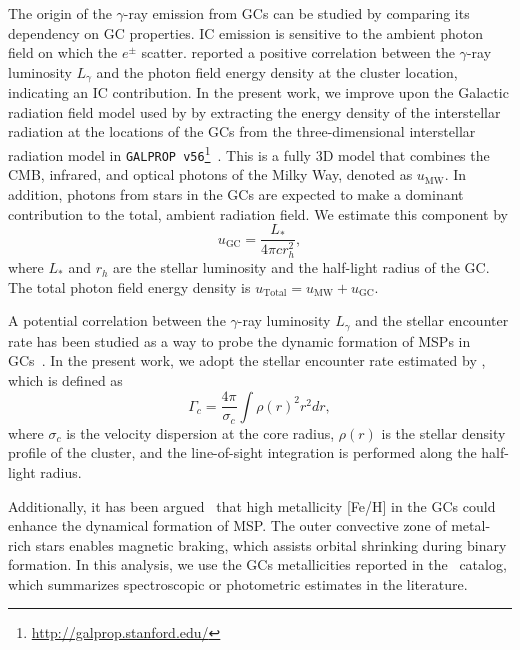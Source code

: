 \documentclass[doublespace,draft,nopageskip]{VTthesis} %
\begin{document}
The origin of the $\gamma$-ray emission from GCs can be studied by comparing its dependency on GC properties. IC emission is sensitive to the ambient photon field on which the $e^\pm$ scatter. \citet{2011ApJ...726..100H} reported a positive correlation between the $\gamma$-ray luminosity $L_\gamma$ and the photon field energy density at the cluster location, indicating an IC contribution. In the present work, we improve upon the Galactic radiation field model used by \citet{2011ApJ...726..100H} by extracting the energy density of the interstellar radiation at the locations of the GCs from the three-dimensional interstellar radiation model in \texttt{GALPROP v56}\footnote{\url{http://galprop.stanford.edu/}}~\citep{2017ApJ...846...67P,2018ApJ...856...45J}. This is a fully 3D model that combines the CMB, infrared, and optical photons of the Milky Way, denoted as $u_\text{MW}$. In addition, photons from stars in the GCs are expected to make a dominant contribution to the total, ambient radiation field. We estimate this component by
\begin{equation}
    u_{\text{GC}} = \dfrac{L_*}{4\pi c r_h^2},
    \label{eq:GCRF}
\end{equation}
where $L_*$ and $r_h$ are the stellar luminosity and the half-light radius of the GC. The total photon field energy density is $u_\text{Total} = u_\text{MW} + u_\text{GC}$.

A potential correlation between the $\gamma$-ray luminosity $L_\gamma$ and the stellar encounter rate has been studied as a way to probe the dynamic formation of MSPs in GCs~\citep{2010A&A...524A..75A,2011ApJ...726..100H,2019MNRAS.486..851D}. In the present work, we adopt the stellar encounter rate estimated by \citet{2013ApJ...766..136B}, which is defined as
\begin{equation}
    \Gamma_c = \frac{4\pi}{\sigma_c}\int\rho(r)^2 r^2dr,
	\label{eq:encounter}
\end{equation}
where $\sigma_c$ is the velocity dispersion at the core radius, $\rho(r)$ is the stellar density profile of the cluster, and the line-of-sight integration is performed along the half-light radius. 

Additionally, it has been argued~\citep{2011ApJ...726..100H,2019MNRAS.486..851D} that high metallicity [Fe/H] in the GCs could enhance the dynamical formation of MSP. The outer convective zone of metal-rich stars enables magnetic braking, which assists orbital shrinking during binary formation. In this analysis, we use the GCs metallicities  reported in the~\citet{1996AJ....112.1487H} catalog, which summarizes  spectroscopic or photometric estimates in the literature.
\end{document}
